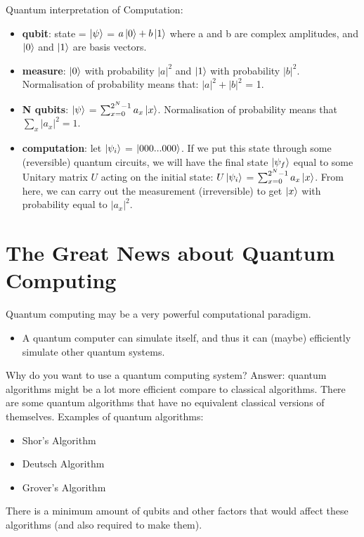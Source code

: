 \documentclass[12pt]{article}
\begin{document}
\begin{enumerate}
Quantum interpretation of Computation:
\begin{itemize}
    \item \textbf{qubit}: state = $\ket{\psi}$ = $a \ket{0} + b \ket{1}$ where a and b are complex amplitudes, and $\ket{0}$ and $\ket{1}$ are basis vectors.

    \item \textbf{measure}: $\ket{0}$ with probability $|a|^2$ and $\ket{1}$ with probability $|b|^2$. Normalisation of probability means that: $|a|^2 + |b|^2$ = 1.

    \item \textbf{N qubits}: $\ket{\psi}$ = $\sum_{x=0}^{2^N - 1} a_x  \ket{x}$. Normalisation of probability means that $\sum_{x} |a_x|^2 = 1. $

    \item \textbf{computation}: let $\ket{\psi_i}$ = $\ket{000...000} $. If we put this state through some (reversible) quantum circuits, we will have the final state $\ket{\psi_f}$ equal to some Unitary matrix $U$ acting on the initial state: $U \ket{\psi_i}$ = $\sum_{x=0}^{2^N - 1} a_x  \ket{x}$. From here, we can carry out the measurement (irreversible) to get $\ket{x}$ with probability equal to $|a_x|^2$.

\end{itemize}

\section{The Great News about Quantum Computing}
Quantum computing may be a very powerful computational paradigm.
\begin{itemize}
    \item A quantum computer can simulate itself, and thus it can (maybe) efficiently simulate other quantum systems. 
\end{itemize}

Why do you want to use a quantum computing system? Answer: quantum algorithms might be a lot more efficient compare to classical algorithms. There are some quantum algorithms that have no equivalent classical versions of themselves. Examples of quantum algorithms:
\begin{itemize}
    \item Shor's Algorithm
    \item Deutsch Algorithm
    \item Grover's Algorithm
\end{itemize}

There is a minimum amount of qubits and other factors that would affect these algorithms (and also required to make them).
    
\end{enumerate}

\nocite{*}

           

                



\end{document}
